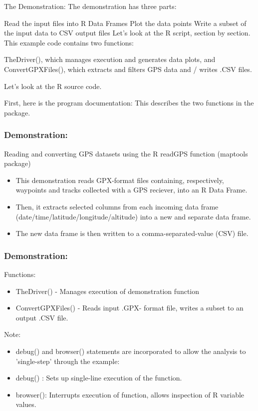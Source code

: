 \documentclass{beamer}
\begin{document}
\begin{frame}[fragile]
The Demonstration:
The demonstration has three parts:

Read the input files into R Data Frames
Plot the data points
Write a subset of the input data to CSV output files
Let's look at the R script, section by section. This example code contains two functions:

TheDriver(), which manages execution and generates data plots, and ConvertGPXFiles(), which extracts and filters GPS data and / writes .CSV files.


 Let's look at the R source code.

First, here is the program documentation: This describes the two functions in the package.

\end{frame}
\begin{frame}
\frametitle{Demonstration:}
Reading and converting GPS datasets using the R readGPS function (maptools package)

\begin{itemize}
\item This demonstration reads GPX-format files containing, respectively, waypoints and tracks collected with a GPS reciever, into  an R Data Frame. 
\item Then, it extracts selected columns from
each incoming data frame (date/time/latitude/longitude/altitude)
into a new and separate data frame. 
\item The new data frame
is then written to a comma-separated-value (CSV) file.
\end{itemize}
\end{frame}
\begin{frame}[fragile]
\frametitle{Demonstration:}
Functions:
\begin{itemize}
\item TheDriver() - Manages execution of demonstration function 
\item ConvertGPXFiles() - Reads input .GPX- format file, writes
a subset to an output .CSV file.
\end{itemize}
\end{frame}
\begin{frame}[fragile]
Note: 
\begin{itemize} 
\item debug() and browser() statements are incorporated to allow the 
analysis to 'single-step' through the example:
\item debug() : Sets up single-line execution of the function.
\item browser(): Interrupts execution of function, allows inspection of R variable values.
\end{itemize}
\end{frame}
\end{document}
